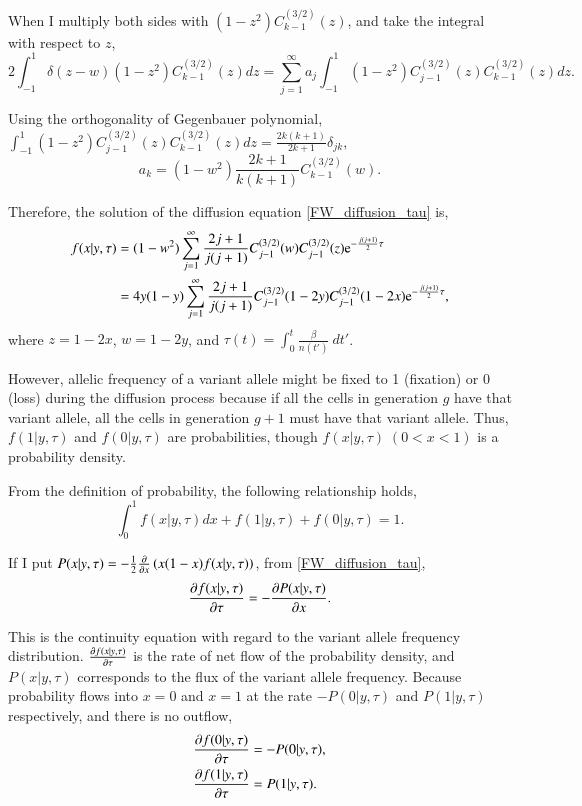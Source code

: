 \documentclass{article}
\begin{document}
When I multiply both sides with $(1-z^2) C^{(3/2)}_{k-1} (z)$, and take the integral with respect to $z$,
\begin{equation}
 2\int_{-1}^{1}\delta(z-w) (1-z^2) C^{(3/2)}_{k-1} (z) dz= \sum_{j=1}^{\infty} a_j \int_{-1}^{1} (1-z^2) C^{(3/2)}_{j-1} (z) C^{(3/2)}_{k-1} (z) dz.
\end{equation}

Using the orthogonality of Gegenbauer polynomial, $\int_{-1}^{1} (1-z^2) C^{(3/2)}_{j-1} (z) C^{(3/2)}_{k-1} (z) dz = \frac{2k(k+1)}{2k+1} \delta_{jk}$,
\begin{equation}
 a_k = (1-w^2) \frac{2k+1}{k(k+1)} C^{(3/2)}_{k-1} (w).
\end{equation}

Therefore, the solution of the diffusion equation \eqref{FW_diffusion_tau} is,
\begin{align}
 f(x|y,\tau) & = (1-w^2) \sum_{j=1}^{\infty} \frac{2j+1}{j(j+1)} C^{(3/2)}_{j-1} (w) C^{(3/2)}_{j-1} (z) \mathrm{e}^{-\frac{j(j+1)}{2}\tau}\\
 & = 4y(1-y) \sum_{j=1}^{\infty} \frac{2j+1}{j(j+1)} C^{(3/2)}_{j-1} (1-2y) C^{(3/2)}_{j-1} (1-2x) \mathrm{e}^{-\frac{j(j+1)}{2}\tau},\label{wf_solution_x}
\end{align}
where $z=1-2x$, $w=1-2y$, and $\tau(t) = \int_{0}^{t} \frac{\beta}{n(t')} \: dt'$.

However, allelic frequency of a variant allele might be fixed to 1 (fixation) or 0 (loss) during the diffusion process because if all the cells in generation $g$ have that variant allele, all the cells in generation $g+1$ must have that variant allele. Thus, $f(1|y,\tau)$ and $f(0|y,\tau)$ are probabilities, though $f(x|y,\tau) \; (0<x<1)$ is a probability density.

From the definition of probability, the following relationship holds,
\begin{equation}
 \int_{0}^{1} f(x|y,\tau) dx + f(1|y,\tau) + f(0|y,\tau) = 1.
\end{equation}

If I put $P(x|y,\tau) = - \frac{1}{2} \frac{\partial {}}{\partial {x}}\left( x(1-x)f(x|y,\tau) \right)$, from \eqref{FW_diffusion_tau},
\begin{equation}
 \frac{\partial {f(x|y,\tau)}}{\partial {\tau}} = - \frac{\partial {P(x|y, \tau)}}{\partial {x}}.
\end{equation}

This is the continuity equation with regard to the variant allele frequency distribution.
$\frac{\partial {f(x|y,\tau)}}{\partial {\tau}}$ is the rate of net flow of the probability density, and $P(x|y,\tau)$ corresponds to the flux of the variant allele frequency.
Because probability flows into $x=0$ and $x=1$ at the rate $-P(0|y,\tau)$ and $P(1|y,\tau)$ respectively, and there is no outflow,
\begin{align}
 \frac{\partial {f(0|y,\tau)}}{\partial {\tau}} & = -P(0|y, \tau),\label{fixation_flow}\\
 \frac{\partial {f(1|y,\tau)}}{\partial {\tau}} & = P(1|y, \tau).\label{loss_flow}
\end{align}
\end{document}
